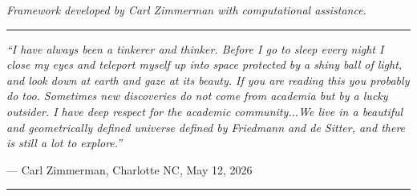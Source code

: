 \documentclass[12pt,a4paper]{article}
\begin{document}
\vspace{1em}
\textit{Framework developed by Carl Zimmerman with computational assistance.}

\vspace{3em}
\begin{center}
\rule{0.8\textwidth}{0.4pt}
\vspace{1em}

\emph{``I have always been a tinkerer and thinker. Before I go to sleep every night I close my eyes and teleport myself up into space protected by a shiny ball of light, and look down at earth and gaze at its beauty. If you are reading this you probably do too. Sometimes new discoveries do not come from academia but by a lucky outsider. I have deep respect for the academic community...We live in a beautiful and geometrically defined universe defined by Friedmann and de Sitter, and there is still a lot to explore.''}

\vspace{0.5em}
--- Carl Zimmerman, Charlotte NC, May 12, 2026

\vspace{1em}
\rule{0.8\textwidth}{0.4pt}
\end{center}
\end{document}
